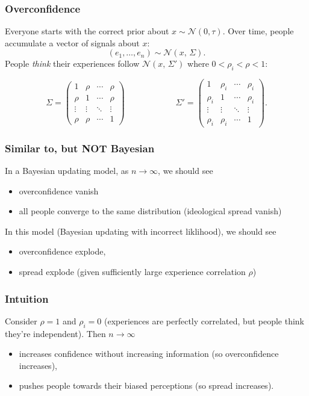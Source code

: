\documentclass[memey]{ali-presentation}
\begin{document}
\begin{frame}
  \frametitle{Overconfidence}

  Everyone starts with the correct prior about $x \sim \mathcal N(0, \tau)$.
  Over time, people accumulate a vector of signals about $x$:
  $$
    (e_1, \ldots, e_n) \sim \mathcal N(x, \, \Sigma).
  $$
  People \emph{think} their experiences follow $\mathcal N(x, \, \Sigma')$ where $0 < \rho_i < \rho < 1$:

  $$
    \Sigma = \begin{pmatrix}
    1 & \rho & \cdots & \rho \\
    \rho & 1 & \cdots & \rho \\
    \vdots & \vdots & \ddots & \vdots \\
    \rho & \rho & \cdots & 1
    \end{pmatrix}
    \hspace{1in}
    \Sigma' = \begin{pmatrix}
    1 & \rho_i & \cdots & \rho_i \\
    \rho_i & 1 & \cdots & \rho_i \\
    \vdots & \vdots & \ddots & \vdots \\
    \rho_i & \rho_i & \cdots & 1
    \end{pmatrix}.
  $$
\end{frame}

\begin{frame}
  \frametitle{Similar to, but NOT Bayesian}

  In a Bayesian updating model, as $n \to \infty$, we should see
  \begin{itemize}
    \item overconfidence vanish
    \item all people converge to the same distribution (ideological spread vanish)
  \end{itemize}

  \pause

  In this model (Bayesian updating with incorrect liklihood), we should see
  \begin{itemize}
    \item overconfidence explode,
    \item spread explode (given sufficiently large experience correlation $\rho$)
  \end{itemize}
\end{frame}

\begin{frame}
  \frametitle{Intuition}

  Consider $\rho = 1$ and $\rho_i = 0$ (experiences are perfectly correlated, but people think they're independent). Then $n \to \infty$
  \begin{itemize}
    \item
      increases confidence without increasing information (so overconfidence increases),
    \item
      pushes people towards their biased perceptions (so spread increases).
  \end{itemize}
\end{frame}
\end{document}
